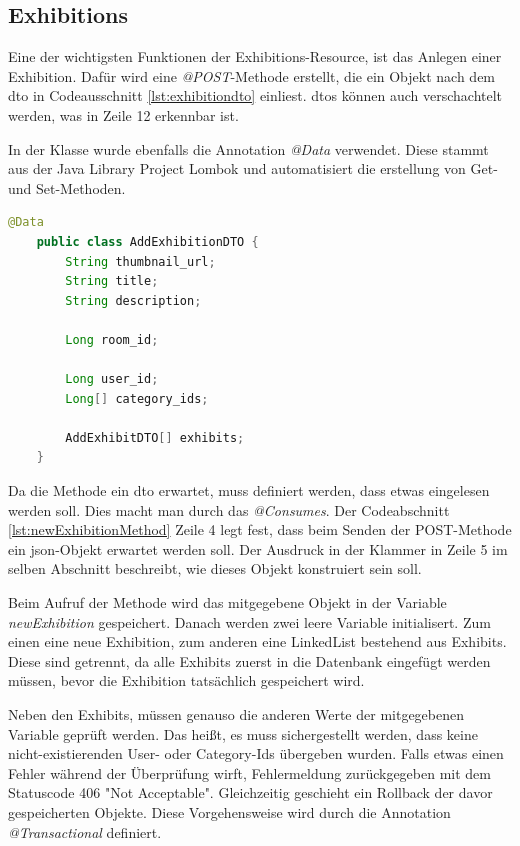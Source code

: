 \subsection{Exhibitions}
Eine der wichtigsten Funktionen der Exhibitions-Resource, ist das Anlegen einer Exhibition. 
Dafür wird eine \emph{@POST}-Methode erstellt, die ein Objekt nach dem \gls{dto} in Codeausschnitt \ref{lst:exhibitiondto} einliest.
\gls{dto}s können auch verschachtelt werden, was in Zeile 12 erkennbar ist. 

In der Klasse wurde ebenfalls die Annotation \emph{@Data} verwendet. 
Diese stammt aus der Java Library Project Lombok und automatisiert die erstellung von Get- und Set-Methoden. 
\cite{Lambok}

\begin{lstlisting}[label=lst:exhibitiondto, language=Java, caption=Exhibition DTO]
    @Data
    public class AddExhibitionDTO {
        String thumbnail_url;
        String title;
        String description;

        Long room_id;

        Long user_id;
        Long[] category_ids;

        AddExhibitDTO[] exhibits;
    }
\end{lstlisting}

Da die Methode ein \gls{dto} erwartet, muss definiert werden, dass etwas eingelesen werden soll. 
Dies macht man durch das \emph{@Consumes}. 
Der Codeabschnitt \ref{lst:newExhibitionMethod} Zeile 4 legt fest, dass beim Senden der POST-Methode ein \gls{json}-Objekt erwartet werden soll. 
Der Ausdruck in der Klammer in Zeile 5 im selben Abschnitt beschreibt, wie dieses Objekt konstruiert sein soll.

Beim Aufruf der Methode wird das mitgegebene Objekt in der Variable \emph{newExhibition} gespeichert.
Danach werden zwei leere Variable initialisert. 
Zum einen eine neue Exhibition, zum anderen eine LinkedList bestehend aus Exhibits.
Diese sind getrennt, da alle Exhibits zuerst in die Datenbank eingefügt werden müssen, bevor die Exhibition tatsächlich gespeichert wird. 

Neben den Exhibits, müssen genauso die anderen Werte der mitgegebenen Variable geprüft werden. 
Das heißt, es muss sichergestellt werden, dass keine nicht-existierenden User- oder Category-Ids übergeben wurden. 
Falls etwas einen Fehler während der Überprüfung wirft, Fehlermeldung zurückgegeben mit dem Statuscode 406 "Not Acceptable". 
Gleichzeitig geschieht ein Rollback der davor gespeicherten Objekte. 
Diese Vorgehensweise wird durch die Annotation \emph{@Transactional} definiert. 

